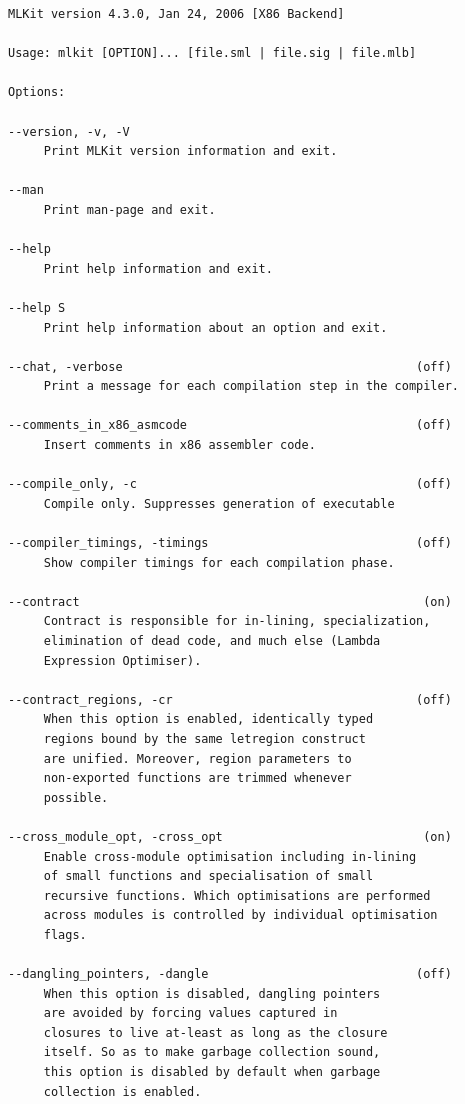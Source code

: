 \documentclass[12pt]{book}
\begin{document}
\begin{verbatim}
MLKit version 4.3.0, Jan 24, 2006 [X86 Backend]

Usage: mlkit [OPTION]... [file.sml | file.sig | file.mlb]

Options:

--version, -v, -V
     Print MLKit version information and exit.

--man
     Print man-page and exit.

--help
     Print help information and exit.

--help S
     Print help information about an option and exit.

--chat, -verbose                                         (off)
     Print a message for each compilation step in the compiler.

--comments_in_x86_asmcode                                (off)
     Insert comments in x86 assembler code.

--compile_only, -c                                       (off)
     Compile only. Suppresses generation of executable

--compiler_timings, -timings                             (off)
     Show compiler timings for each compilation phase.

--contract                                                (on)
     Contract is responsible for in-lining, specialization,
     elimination of dead code, and much else (Lambda
     Expression Optimiser).

--contract_regions, -cr                                  (off)
     When this option is enabled, identically typed
     regions bound by the same letregion construct
     are unified. Moreover, region parameters to
     non-exported functions are trimmed whenever
     possible.

--cross_module_opt, -cross_opt                            (on)
     Enable cross-module optimisation including in-lining
     of small functions and specialisation of small
     recursive functions. Which optimisations are performed
     across modules is controlled by individual optimisation
     flags.

--dangling_pointers, -dangle                             (off)
     When this option is disabled, dangling pointers
     are avoided by forcing values captured in
     closures to live at-least as long as the closure
     itself. So as to make garbage collection sound,
     this option is disabled by default when garbage
     collection is enabled.


\end{verbatim}
\end{document}
